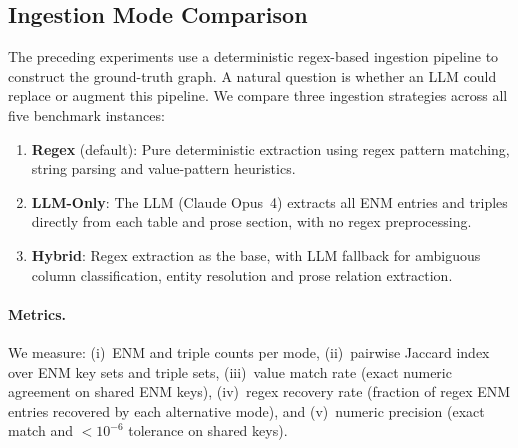 \documentclass[11pt]{article}
\begin{document}
\subsection{Ingestion Mode Comparison}
\label{sec:ingestion_modes}

The preceding experiments use a deterministic regex-based ingestion
pipeline to construct the ground-truth graph.  A natural question is
whether an LLM could replace or augment this pipeline.  We compare
three ingestion strategies across all five benchmark instances:

\begin{enumerate}[leftmargin=2em]
  \item \textbf{Regex} (default): Pure deterministic extraction using
    regex pattern matching, string parsing and value-pattern heuristics.
  \item \textbf{LLM-Only}: The LLM (Claude Opus~4) extracts all ENM
    entries and triples directly from each table and prose section,
    with no regex preprocessing.
  \item \textbf{Hybrid}: Regex extraction as the base, with LLM
    fallback for ambiguous column classification, entity resolution
    and prose relation extraction.
\end{enumerate}

\paragraph{Metrics.}
We measure: (i)~ENM and triple counts per mode, (ii)~pairwise Jaccard
index over ENM key sets and triple sets, (iii)~value match rate (exact
numeric agreement on shared ENM keys), (iv)~regex recovery rate
(fraction of regex ENM entries recovered by each alternative mode),
and (v)~numeric precision (exact match and $<10^{-6}$ tolerance on
shared keys).
\end{document}
